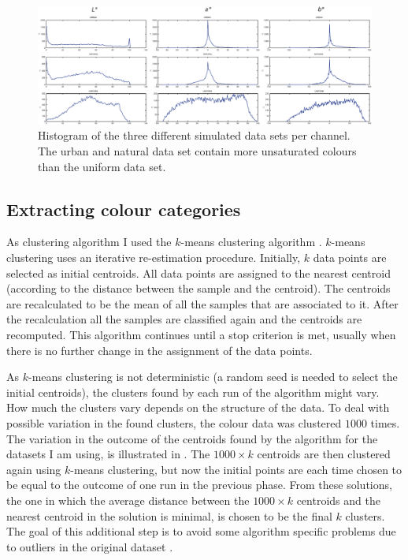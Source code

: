 \begin{figure} 
\centering
\includegraphics[width=\textwidth]{./experiments/figures/data-sets-histogram.pdf}
\caption[Histogram of three different simulated data sets per
channel]{Histogram of the three different simulated data sets per
  channel. The urban and natural data set contain more unsaturated
  colours than the uniform data set.}
\label{f:data-sets-histogram}
\end{figure}

\subsection{Extracting colour categories}

As clustering algorithm I used the $k$-means clustering algorithm
\citep{lloyd82least}. $k$-means clustering uses an iterative
re-estimation procedure. Initially, $k$ data points are selected as
initial centroids. All data points are assigned to the nearest
centroid (according to the distance between the sample and the
centroid). The centroids are recalculated to be the mean of all the
samples that are associated to it.  After the recalculation all the
samples are classified again and the centroids are recomputed. This
algorithm continues until a stop criterion is met, usually when there
is no further change in the assignment of the data points.

As $k$-means clustering is not deterministic (a random seed is needed
to select the initial centroids), the clusters found by each run of
the algorithm might vary. How much the clusters vary depends on the
structure of the data. To deal with possible variation in the found
clusters, the colour data was clustered $1000$ times. The variation in
the outcome of the centroids found by the algorithm for the datasets I
am using, is illustrated in . The $1000
\times k$ centroids are then clustered again using $k$-means
clustering, but now the initial points are each time chosen to be
equal to the outcome of one run in the previous phase. From these
solutions, the one in which the average distance between the $1000
\times k$ centroids and the nearest centroid in the solution is
minimal, is chosen to be the final $k$ clusters. The goal of this
additional step is to avoid some algorithm specific problems due to
outliers in the original dataset \citep{bradley98refining}.

